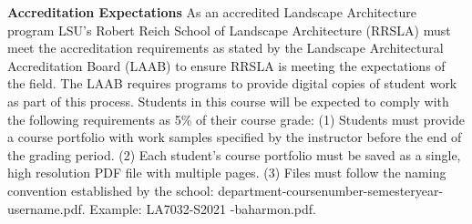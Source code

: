 \documentclass[11pt,article,oneside]{memoir}
\begin{document}
\clearpage

\noindent \textbf{Accreditation Expectations}
As an accredited Landscape Architecture program
LSU's Robert Reich School of Landscape Architecture (RRSLA) 
must meet the accreditation requirements 
as stated by the Landscape Architectural Accreditation
Board (LAAB) to ensure RRSLA is meeting the expectations of the field. 
The LAAB requires programs to provide digital copies 
of student work as part of this process.
Students in this course will be expected 
to comply with the following requirements
as 5\% of their course grade: 
(1) Students must provide a course portfolio
with work samples specified by the instructor 
before the end of the grading period. 
(2) Each student's course portfolio must be saved as 
a single, high resolution PDF file with multiple pages. 
(3) Files must follow the naming convention
established by the school: department-coursenumber-semesteryear-username.pdf.
Example: LA7032-S2021 -baharmon.pdf.\\
\end{document}
